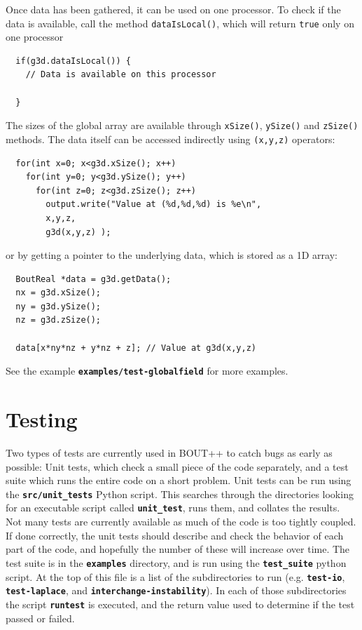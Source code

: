 \documentclass[12pt]{article}
\newcommand{\file}[1]{\texttt{\bf #1}}
\begin{document}
Once data has been gathered, it can be used on one processor. To check if the
data is available, call the method
%
\lstinline!dataIsLocal()!, which will return \lstinline!true!
%
 only on one processor
%
\begin{lstlisting}
  if(g3d.dataIsLocal()) {
    // Data is available on this processor

  }
\end{lstlisting}
%
The sizes of the global array are available through
%
\lstinline!xSize()!, \lstinline!ySize()! and \lstinline!zSize()!
%
methods. The data itself can be accessed indirectly using
%
\lstinline!(x,y,z)!
%
 operators:
%
\begin{lstlisting}
  for(int x=0; x<g3d.xSize(); x++)
    for(int y=0; y<g3d.ySize(); y++)
      for(int z=0; z<g3d.zSize(); z++)
        output.write("Value at (%d,%d,%d) is %e\n",
        x,y,z,
        g3d(x,y,z) );
\end{lstlisting}
%
or by getting a pointer to the underlying data, which is stored as a 1D array:
%
\begin{lstlisting}
  BoutReal *data = g3d.getData();
  nx = g3d.xSize();
  ny = g3d.ySize();
  nz = g3d.zSize();

  data[x*ny*nz + y*nz + z]; // Value at g3d(x,y,z)
\end{lstlisting}
%
See the example \file{examples/test-globalfield} for more examples.





\section{Testing}
%
Two types of tests are currently used in BOUT++ to catch bugs as early as
possible: Unit tests, which check a small piece of the code separately, and a
test suite which runs the entire code on a short problem.
%
%
Unit tests can be run using the \file{src/unit\_tests} Python script. This
searches through the directories looking for an executable script called
\file{unit\_test}, runs them, and collates the results. Not many tests are
currently available as much of the code is too tightly coupled. If done
correctly, the unit tests should describe and check the behavior of each part
of the code, and hopefully the number of these will increase over time.
%
%
The test suite is in the \file{examples} directory, and is run using the
\file{test\_suite} python script. At the top of this file is a list of the
subdirectories to run (e.g. \file{test-io}, \file{test-laplace}, and
\file{interchange-instability}). In each of those subdirectories the script
\file{runtest} is executed, and the return value used to determine if the test
passed or failed.
\end{document}
